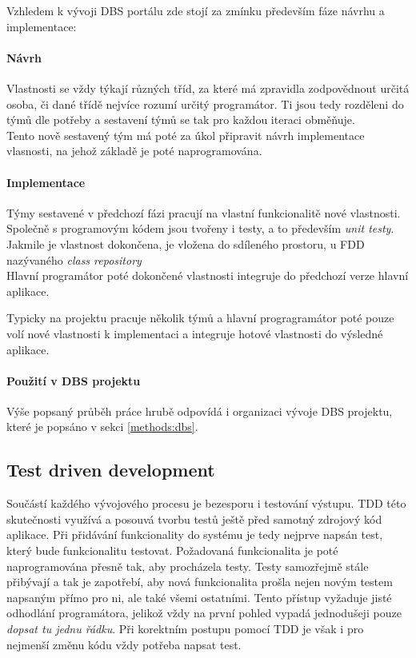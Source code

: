 Vzhledem k vývoji DBS portálu zde stojí za zmínku především fáze návrhu a implementace:

\paragraph{Návrh}
Vlastnosti se vždy týkají různých tříd, za které má zpravidla zodpovědnout určitá osoba, či dané třídě nejvíce rozumí určitý programátor. Ti jsou tedy rozděleni do týmů dle potřeby a sestavení týmů se tak pro každou iteraci obměňuje.\\
Tento nově sestavený tým má poté za úkol připravit návrh implementace vlasnosti, na jehož základě je poté naprogramována.

\paragraph{Implementace}
Týmy sestavené v předchozí fázi pracují na vlastní funkcionalitě nové vlastnosti. Společně s programovým kódem jsou tvořeny i testy, a to především \emph{unit testy}.\\
Jakmile je vlastnost dokončena, je vložena do sdíleného prostoru, u FDD nazývaného \emph{class repository}\\
Hlavní programátor poté dokončené vlastnosti integruje do předchozí verze hlavní aplikace.

Typicky na projektu pracuje několik týmů a hlavní progragramátor poté pouze volí nové vlastnosti k implementaci a integruje hotové vlastnosti do výsledné aplikace.

\paragraph{Použití v DBS projektu}
Výše popsaný průběh práce hrubě odpovídá i organizaci vývoje DBS projektu, které je popsáno v sekci \ref{methods:dbs}.


\subsection{Test driven development} \label{methods:tdd}

Součástí každého vývojového procesu je bezesporu i testování výstupu. TDD této skutečnosti využívá a posouvá tvorbu testů ještě před samotný zdrojový kód aplikace. Při přidávání funkcionality do systému je tedy nejprve napsán test, který bude funkcionalitu testovat. Požadovaná funkcionalita je poté naprogramována přesně tak, aby procházela testy. Testy samozřejmě stále přibývají a tak je zapotřebí, aby nová funkcionalita prošla nejen novým testem napsaným přímo pro ni, ale také všemi ostatními.
Tento přístup vyžaduje jisté odhodlání programátora, jelikož vždy na první pohled vypadá jednodušeji pouze \emph{dopsat tu jednu řádku}. Při korektním postupu pomocí TDD je však i pro nejmenší změnu kódu vždy potřeba napsat test.

